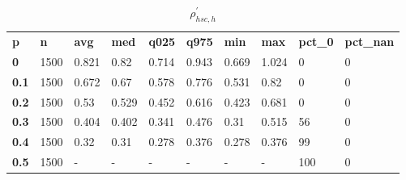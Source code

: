 \begin{table}[h]
 \centering 
\footnotesize
\caption{$\rho_{hsc,h}^\prime $}
\label{tab:alphahsch}
\begin{tabular}[h]{| l l l l l l l l l l|
    } \hline
\textbf{ p} & \textbf{ n} & \textbf{ avg} & \textbf{ med} & \textbf{ q025} & \textbf{ q975} & \textbf{ min} & \textbf{ max} & \textbf{ pct\_0} & \textbf{ pct\_nan}
           \\
  \textbf{  0} & 1500 & 0.821 &  0.82 & 0.714 & 0.943 & 0.669 & 1.024 &   0 & 0
           \\
  \textbf{0.1} & 1500 & 0.672 &  0.67 & 0.578 & 0.776 & 0.531 &  0.82 &   0 & 0
           \\
  \textbf{0.2} & 1500 &  0.53 & 0.529 & 0.452 & 0.616 & 0.423 & 0.681 &   0 & 0
           \\
  \textbf{0.3} & 1500 & 0.404 & 0.402 & 0.341 & 0.476 &  0.31 & 0.515 &  56 & 0
           \\
  \textbf{0.4} & 1500 &  0.32 &  0.31 & 0.278 & 0.376 & 0.278 & 0.376 &  99 & 0
           \\
  \textbf{0.5} & 1500 & - & - & - & - & - & - & 100 & 0
           \\
 \hline \end{tabular}
 \end{table}
